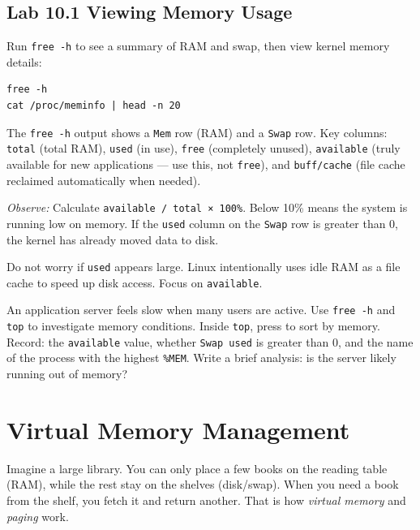 \subsection*{Lab 10.1 Viewing Memory Usage}

Run \texttt{free -h} to see a summary of RAM and swap, then view kernel memory
details:

\begin{lstlisting}[caption={Memory summary and details}]
free -h
cat /proc/meminfo | head -n 20
\end{lstlisting}

The \texttt{free -h} output shows a \texttt{Mem} row (RAM) and a \texttt{Swap}
row. Key columns: \texttt{total} (total RAM), \texttt{used} (in use), \texttt{free}
(completely unused), \texttt{available} (truly available for new applications ---
use this, not \texttt{free}), and \texttt{buff/cache} (file cache reclaimed
automatically when needed).

\textit{Observe:} Calculate \texttt{available / total × 100\%}. Below 10\% means
the system is running low on memory. If the \texttt{used} column on the \texttt{Swap}
row is greater than 0, the kernel has already moved data to disk.

\begin{tipbox}
Do not worry if \texttt{used} appears large. Linux intentionally uses idle RAM as
a file cache to speed up disk access. Focus on \texttt{available}.
\end{tipbox}

\begin{challengebox}
An application server feels slow when many users are active. Use \texttt{free -h}
and \texttt{top} to investigate memory conditions. Inside \texttt{top}, press
 to sort by memory. Record: the \texttt{available} value, whether
\texttt{Swap used} is greater than 0, and the name of the process with the highest
\texttt{\%MEM}. Write a brief analysis: is the server likely running out of memory?
\end{challengebox}

\section{Virtual Memory Management}

Imagine a large library. You can only place a few books on the reading table (RAM),
while the rest stay on the shelves (disk/swap). When you need a book from the shelf,
you fetch it and return another. That is how \textit{virtual memory} and
\textit{paging} work.

